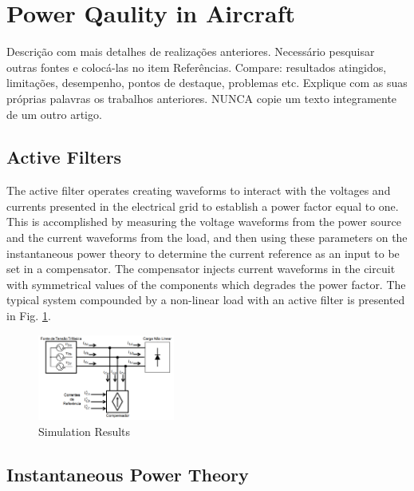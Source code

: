 \section{Power Qaulity in Aircraft}

Descrição com mais detalhes de realizações anteriores. Necessário pesquisar outras fontes e colocá-las no item Referências.
 Compare: resultados atingidos, limitações, desempenho, pontos de destaque, problemas etc. Explique com as suas próprias palavras os trabalhos anteriores. 
NUNCA copie um texto integramente de um outro artigo.

\subsection{Active Filters}

The active filter operates creating waveforms to interact with the voltages and currents presented in the electrical grid to establish a power factor equal to one. This is accomplished by measuring the voltage waveforms from the power source and the current waveforms from the load, and then using these parameters on the instantaneous power theory to determine the current reference as an input to be set in a compensator. The compensator injects current waveforms in the circuit with symmetrical values of the components which degrades the power factor. The typical system compounded by a non-linear load with an active filter is presented in Fig. \ref{fig:compensador.png}.

\begin{figure}
	\centering
	\includegraphics[width=0.4\textwidth]{Figures/compensador.png}
	\caption{Simulation Results}
	\label{fig:compensador.png}
\end{figure}


\subsection{Instantaneous Power Theory}

